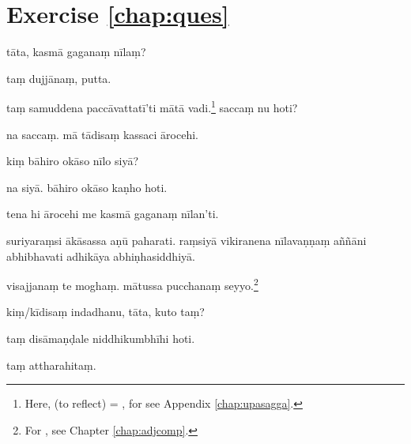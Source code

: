 \section*{Exercise \ref{chap:ques}}
\begin{answerkey}
\item t\=ata, kasm\=a gagana\d m n\=ila\d m?
\item ta\d m dujj\=ana\d m, putta.
\item ta\d m samuddena pacc\=avattat\=i'ti m\=at\=a vadi.\footnote{Here,  (to reflect) = , for  see Appendix \ref {chap:upasagga}.} sacca\d m nu hoti?
\item na sacca\d m. m\=a t\=adisa\d m kassaci \=arocehi.
\item ki\d m b\=ahiro ok\=aso n\=ilo siy\=a?
\item na siy\=a. b\=ahiro ok\=aso ka\d nho hoti.
\item tena hi \=arocehi me kasm\=a gagana\d m n\=ilan'ti.
\item suriyara\d msi \=ak\=asassa a\d n\=u paharati. ra\d msiy\=a vikiranena n\=ilava\d n\d na\d m a\~n\~n\=ani abhibhavati adhik\=aya abhi\d nhasiddhiy\=a.
\item visajjana\d m te mogha\d m. m\=atussa pucchana\d m seyyo.\footnote{For , see Chapter \ref{chap:adjcomp}.}
\item ki\d m/k\=idisa\d m indadhanu, t\=ata, kuto ta\d m?
\item ta\d m dis\=ama\d n\d dale niddhikumbh\=ihi hoti.
\item ta\d m attharahita\d m.
\end{answerkey}

